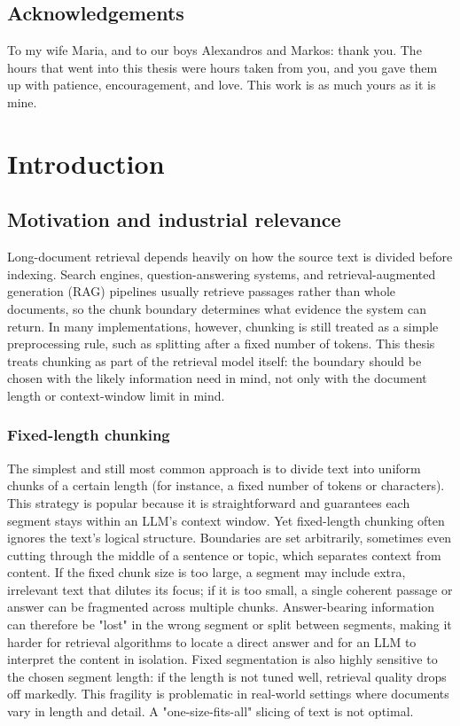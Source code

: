 \documentclass[12pt,a4paper]{report}
\begin{document}
\newpage

\section*{Acknowledgements}

To my wife Maria, and to our boys Alexandros and Markos: thank you. The hours that went into this thesis were hours taken from you, and you gave them up with patience, encouragement, and love. This work is as much yours as it is mine.

\newpage

\tableofcontents

\newpage

\chapter{Introduction}

\section{Motivation and industrial relevance}
Long-document retrieval depends heavily on how the source text is divided before indexing. Search engines, question-answering systems, and retrieval-augmented generation (RAG) pipelines usually retrieve passages rather than whole documents, so the chunk boundary determines what evidence the system can return. In many implementations, however, chunking is still treated as a simple preprocessing rule, such as splitting after a fixed number of tokens. This thesis treats chunking as part of the retrieval model itself: the boundary should be chosen with the likely information need in mind, not only with the document length or context-window limit in mind.

\subsection{Fixed-length chunking}
The simplest and still most common approach is to divide text into uniform chunks of a certain length (for instance, a fixed number of tokens or characters). This strategy is popular because it is straightforward and guarantees each segment stays within an LLM's context window. Yet fixed-length chunking often ignores the text's logical structure. Boundaries are set arbitrarily, sometimes even cutting through the middle of a sentence or topic, which separates context from content. If the fixed chunk size is too large, a segment may include extra, irrelevant text that dilutes its focus; if it is too small, a single coherent passage or answer can be fragmented across multiple chunks. Answer-bearing information can therefore be "lost" in the wrong segment or split between segments, making it harder for retrieval algorithms to locate a direct answer and for an LLM to interpret the content in isolation. Fixed segmentation is also highly sensitive to the chosen segment length: if the length is not tuned well, retrieval quality drops off markedly. This fragility is problematic in real-world settings where documents vary in length and detail. A "one-size-fits-all" slicing of text is not optimal.
\end{document}
